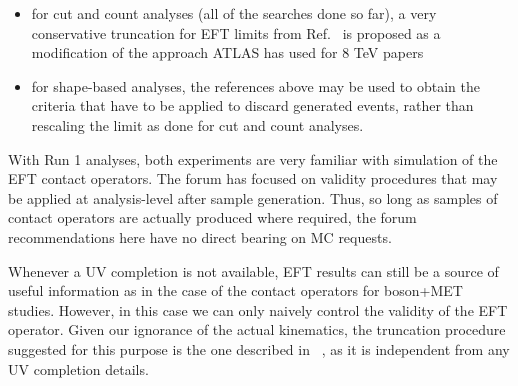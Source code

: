 \documentclass[a4,debug,notitlepage,nobib]{tufte-handout}
\begin{document}
\begin{itemize}
\item for cut and count analyses (all of the searches done so far), a very conservative truncation for EFT 
limits from Ref.~\cite{Racco:2015dxa} is proposed as a modification of the approach 
ATLAS has used for 8 TeV papers~\cite{Aad:2015zva}
\item for shape-based analyses, the references above may be used to obtain the criteria that 
have to be applied to discard generated events, rather than rescaling the limit as done
for cut and count analyses. 
\end{itemize}

With Run 1 analyses, both experiments are very familiar with
simulation of the EFT contact operators. The forum has focused on
validity procedures that may be applied at analysis-level after sample
generation. Thus, so long as samples of contact operators are actually
produced where required, the forum recommendations here have no direct
bearing on MC requests.

Whenever a UV completion is not available, EFT results can still
be a source of useful information as in the case of the contact operators 
for boson+MET studies. 
However, in this case we can only naively control the validity of the EFT operator. 
Given our ignorance of
the actual kinematics, 
the truncation procedure suggested for this purpose
is the one described in ~\cite{Racco:2015dxa},
as it is independent from any UV completion details. 




\end{document}
